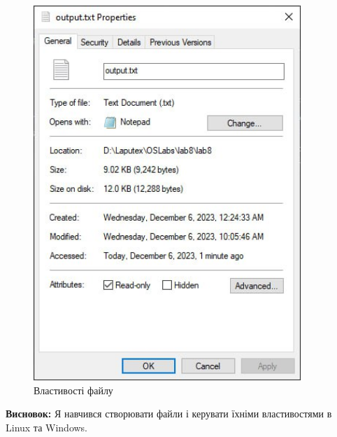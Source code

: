 \documentclass[12pt]{extarticle}
\begin{document}
\begin{figure}[H]
    \centering
    \includegraphics[width=0.90\textwidth]{win_prop}
    \caption{Властивості файлу}
\end{figure}

\textbf{Висновок:}
Я навчився створювати файли і керувати їхніми властивостями в Linux та Windows.
 
\end{document}

